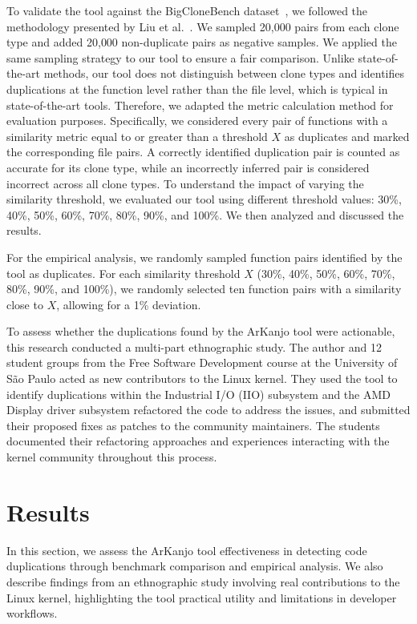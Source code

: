 \documentclass[conference]{IEEEtran}
\begin{document}
To validate the tool against the BigCloneBench dataset~\cite{bigclonebench}, we followed
the methodology presented by Liu et al.~\cite{tailor}. We sampled 20{,}000 pairs from each clone
type and added 20{,}000 non-duplicate pairs as negative samples. We applied the same sampling
strategy to our tool to ensure a fair comparison.
Unlike state-of-the-art methods, our tool does not distinguish between clone types and
identifies duplications at the function level rather than the file level, which is typical in
state-of-the-art tools. Therefore, we adapted the metric calculation method for evaluation
purposes. Specifically, we considered every pair of functions with a similarity metric
equal to or greater than a threshold $X$ as duplicates and marked the corresponding file
pairs. A correctly identified duplication pair is counted as accurate for its clone type, while
an incorrectly inferred pair is considered incorrect across all clone types.
To understand the impact of varying the similarity threshold, we evaluated our tool using
different threshold values: 30\%, 40\%, 50\%, 60\%, 70\%, 80\%, 90\%, and 100\%. We then analyzed
and discussed the results.

For the empirical analysis, we randomly sampled function pairs identified by the tool as
duplicates. For each similarity threshold $X$ (30\%, 40\%, 50\%, 60\%, 70\%, 80\%, 90\%, and 100\%), 
we randomly selected ten function pairs with a similarity close to $X$, allowing for a 1\%
deviation.

To assess whether the duplications found by the ArKanjo tool were actionable, this research conducted 
a multi-part ethnographic study. The author and 12 student groups from the
Free Software Development course at the University of São Paulo acted as new contributors 
to the Linux kernel. 
They used the tool to identify duplications within the Industrial I/O (IIO) subsystem and the AMD Display 
driver subsystem refactored the code to address the issues, and submitted their proposed 
fixes as patches to the community maintainers. The students documented 
their refactoring approaches and experiences interacting with the kernel community throughout this process.


\section{Results}

In this section, we assess the ArKanjo tool effectiveness in detecting code duplications through benchmark comparison and empirical analysis. We also describe findings from an ethnographic study involving real contributions to the Linux kernel, highlighting the tool practical utility and limitations in developer workflows.
\end{document}
